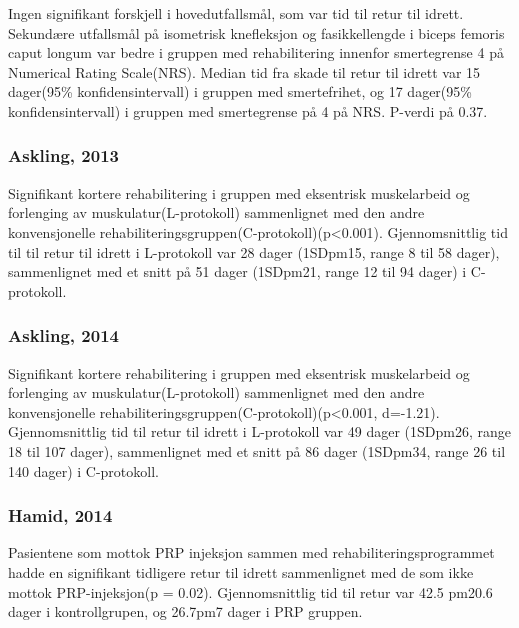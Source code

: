 \documentclass[
]{book}
\begin{document}
Ingen signifikant forskjell i hovedutfallsmål, som var tid til retur til idrett. Sekundære utfallsmål på isometrisk knefleksjon og fasikkellengde i biceps femoris caput longum var bedre i gruppen med rehabilitering innenfor smertegrense 4 på Numerical Rating Scale(NRS). Median tid fra skade til retur til idrett var 15 dager(95\% konfidensintervall) i gruppen med smertefrihet, og 17 dager(95\% konfidensintervall) i gruppen med smertegrense på 4 på NRS. P-verdi på 0.37.

\hypertarget{askling-2013-askling2013}{%
\subsubsection{\texorpdfstring{Askling, 2013 \citep{askling2013}}{Askling, 2013 {[}@askling2013{]}}}\label{askling-2013-askling2013}}

Signifikant kortere rehabilitering i gruppen med eksentrisk muskelarbeid og forlenging av muskulatur(L-protokoll) sammenlignet med den andre konvensjonelle rehabiliteringsgruppen(C-protokoll)(p\textless0.001). Gjennomsnittlig tid til til retur til idrett i L-protokoll var 28 dager (1SDpm15, range 8 til 58 dager), sammenlignet med et snitt på 51 dager (1SDpm21, range 12 til 94 dager) i C-protokoll.

\hypertarget{askling-2014-askling2014}{%
\subsubsection{\texorpdfstring{Askling, 2014 \citep{askling2014}}{Askling, 2014 {[}@askling2014{]}}}\label{askling-2014-askling2014}}

Signifikant kortere rehabilitering i gruppen med eksentrisk muskelarbeid og forlenging av muskulatur(L-protokoll) sammenlignet med den andre konvensjonelle rehabiliteringsgruppen(C-protokoll)(p\textless0.001, d=-1.21). Gjennomsnittlig tid til retur til idrett i L-protokoll var 49 dager (1SDpm26, range 18 til 107 dager), sammenlignet med et snitt på 86 dager (1SDpm34, range 26 til 140 dager) i C-protokoll.

\hypertarget{hamid-2014-ahamid2014}{%
\subsubsection{\texorpdfstring{Hamid, 2014 \citep{ahamid2014}}{Hamid, 2014 {[}@ahamid2014{]}}}\label{hamid-2014-ahamid2014}}

Pasientene som mottok PRP injeksjon sammen med rehabiliteringsprogrammet hadde en signifikant tidligere retur til idrett sammenlignet med de som ikke mottok PRP-injeksjon(p = 0.02). Gjennomsnittlig tid til retur var 42.5 pm20.6 dager i kontrollgrupen, og 26.7pm7 dager i PRP gruppen.
\end{document}
